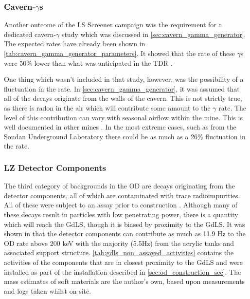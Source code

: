 


\subsubsection{Cavern-$\gamma$s}
\par
Another outcome of the LS Screener campaign was the requirement for a dedicated cavern-$\gamma$ study which was discussed in \autoref{sec:cavern_gamma_generator}.
The expected rates have already been shown in \autoref{tab:cavern_gamma_generator_parameters}.
It showed that the rate of these $\gamma$s were 50\% lower than what was anticipated in the TDR \cite{LZ_TechnicalDesignReview_ref}.
\par
One thing which wasn't included in that study, however, was the possibility of a fluctuation in the rate.
In \autoref{sec:cavern_gamma_generator}, it was assumed that all of the decays originate from the walls of the cavern.
This is not strictly true, as there is radon in the air which will contribute some amount to the $\gamma$ rate.
The level of this contribution can vary with seasonal airflow within the mine.
This is well documented in other mines \cite{finnish_mine_radon_ref,nepal_mine_radon_ref,minos_annual_modulation_ref}.
In the most extreme cases, such as from the Soudan Underground Laboratory \cite{cavern_gammas_in_Soudan_mine_ref} there could be as much as a 26\% fluctuation in the rate.

\subsubsection{LZ Detector Components}
\par
The third category of backgrounds in the OD are decays originating from the detector components, all of which are contaminated with trace radioimpurities.
All of these were subject to an assay prior to construction \cite{LZ_assay_ref}.
Although many of these decays result in particles with low penetrating power, there is a quantity which will reach the GdLS, though it is biased by proximity to the GdLS.
It was shown in \cite{scotthaselschwardt_thesis_ref} that the detector components can contribute as much as 11.9 Hz to the OD rate above 200 keV with the majority (5.5Hz) from the acrylic tanks and associated support structure.
\autoref{tab:gdls_non_assayed_activities} contains the activities of the components that are in closest proximity to the GdLS and were installed as part of the installation described in \autoref{sec:od_construction_sec}.
The mass estimates of soft materials are the author's own, based upon measurements and logs taken whilst on-site.

